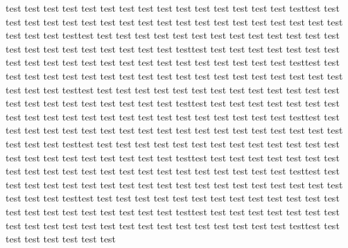 test test test test test test test test test test test test test test test testtest test test test test test test test
test test test test test test test test test test test test test test test testtest test test test test test test test
test test test test test test test test test test test test test test test testtest test test test test test test test
test test test test test test test test test test test test test test test testtest test test test test test test test
test test test test test test test test test test test test test test test testtest test test test test test test test
test test test test test test test test test test test test test test test testtest test test test test test test test
test test test test test test test test test test test test test test test testtest test test test test test test test
test test test test test test test test test test test test test test test testtest test test test test test test test
test test test test test test test test test test test test test test test testtest test test test test test test test
test test test test test test test test test test test test test test test testtest test test test test test test test
test test test test test test test test test test test test test test test testtest test test test test test test test
test test test test test test test test test test test test test test test testtest test test test test test test test
test test test test test test test test test test test test test test test testtest test test test test test test test



